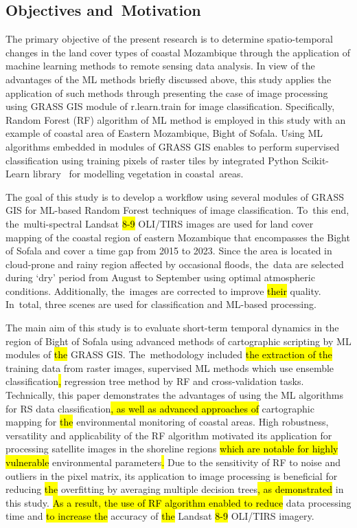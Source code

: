 \documentclass[coasts,article,accept,pdftex,oneauthor]{Definitions/mdpi}
\begin{document}
\subsection{Objectives and~Motivation}

{The primary objective of the present research is to determine spatio-temporal changes in the land cover types of coastal Mozambique through the application of machine learning methods to remote sensing data analysis. }In view of the advantages of the ML methods briefly discussed above, {this study applies} the application of such methods {through presenting} the case of image processing using GRASS GIS module of r.learn.train for image classification. Specifically,{ }Random Forest (RF) algorithm of ML method{ is employed in this study }with an example of coastal area of Eastern Mozambique, Bight of Sofala. Using ML algorithms embedded in modules of GRASS GIS enables to perform supervised classification using training pixels of raster tiles by integrated Python Scikit-Learn library~\cite{Pedregosa} for modelling vegetation in coastal~areas. 

{The goal of this study is to develop a workflow using several modules of GRASS GIS for ML-based Random Forest techniques of image classification. To~this end, the~multi-spectral Landsat \hl{8-9} %
 OLI/TIRS images are used for land cover mapping of the coastal region of eastern Mozambique that encompasses the Bight of Sofala and cover a time gap from 2015 to 2023. Since the area is located in cloud-prone and rainy region affected by occasional floods, the~data are selected during `dry' period from August to September using optimal atmospheric conditions. Additionally, the~images are corrected to improve \hl{their} quality. In~total, three scenes are used for classification and ML-based processing.}

{The main aim of this study is to evaluate short-term temporal dynamics in the region of Bight of Sofala using advanced methods of cartographic scripting by ML modules of \hl{the} GRASS GIS. The~methodology included \hl{the extraction of the }training data from\hl{ }raster images, supervised ML methods which use ensemble classification\hl{, }regression tree method by RF and cross-validation tasks. Technically, this paper demonstrates the advantages of using the ML algorithms for RS data classification\hl{, as well as advanced approaches of} cartographic mapping for \hl{the }environmental monitoring of coastal areas}. {High robustness, versatility and applicability of the RF algorithm motivated its application for processing satellite images in the shoreline regions \hl{which are notable for highly vulnerable} environmental parameters\hl{. }Due to the sensitivity of RF to noise and outliers in the pixel matrix, its application to image processing is beneficial for reducing \hl{the} overfitting by averaging multiple decision trees\hl{, as demonstrated} in this study. \hl{As a result, the use of RF algorithm enabled to reduce} data processing time and \hl{to increase the} accuracy of \hl{the }Landsat \hl{8-9} OLI/TIRS imagery}. 
\end{document}
